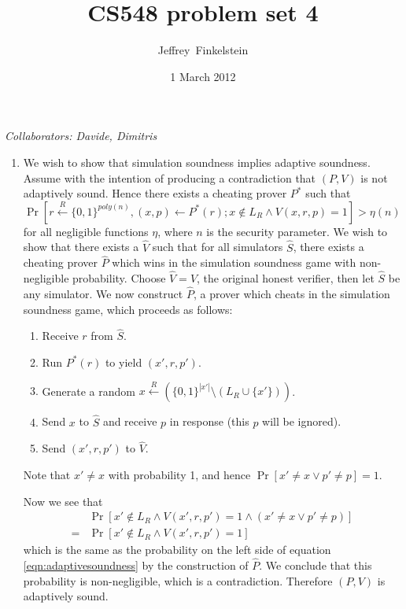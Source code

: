 \documentclass[draft]{article}
\author{Jef{}frey~Finkelstein}
\date{1 March 2012}
\title{CS548 problem set 4}
\newcommand{\collaborators}[1]{\emph{Collaborators: #1}}
\newcommand{\getr}{\overset{R}{\gets}}
\newcommand{\getrsingle}{\getr\{0, 1\}}
\newcommand{\getrpoly}{\getrsingle^{poly(n)}}
\begin{document}
\maketitle
\collaborators{Davide, Dimitris}
\begin{enumerate}
\item
  We wish to show that simulation soundness implies adaptive soundness.
  Assume with the intention of producing a contradiction that $(P, V)$ is not adaptively sound.
  Hence there exists a cheating prover $P^*$ such that
  \begin{equation}\label{eqn:adaptivesoundness}
    \Pr\left[r\getrpoly, (x, p)\gets P^*(r); x\notin L_R \land V(x, r, p) = 1\right] > \eta(n)
  \end{equation}
  for all negligible functions $\eta$, where $n$ is the security parameter.
  We wish to show that there exists a $\hat{V}$ such that for all simulators $\hat{S}$, there exists a cheating prover $\hat{P}$ which wins in the simulation soundness game with non-negligible probability.
  Choose $\hat{V}=V$, the original honest verifier, then let $\hat{S}$ be any simulator.
  We now construct $\hat{P}$, a prover which cheats in the simulation soundness game, which proceeds as follows:
  \begin{enumerate}
  \item Receive $r$ from $\hat{S}$.
  \item Run $P^*(r)$ to yield $(x', r, p')$.
  \item Generate a random $x\getr(\{0,1\}^{|x'|}\setminus(L_R\cup\{x'\}))$.
  \item Send $x$ to $\hat{S}$ and receive $p$ in response (this $p$ will be ignored).
  \item Send $(x', r, p')$ to $\hat{V}$.
  \end{enumerate}
  Note that $x'\neq x$ with probability 1, and hence $\Pr[x'\neq x \lor p'\neq p]=1$.

  Now we see that
  \begin{align*}
    & \Pr\left[x'\notin L_R \land V(x', r, p')=1 \land (x'\neq x \lor p'\neq p)\right] \\
    = & \Pr\left[x'\notin L_R \land V(x', r, p')=1\right]
  \end{align*}
  which is the same as the probability on the left side of equation \ref{eqn:adaptivesoundness} by the construction of $\hat{P}$.
  We conclude that this probability is non-negligible, which is a contradiction.
  Therefore $(P, V)$ is adaptively sound.


\end{enumerate}
\end{document}
